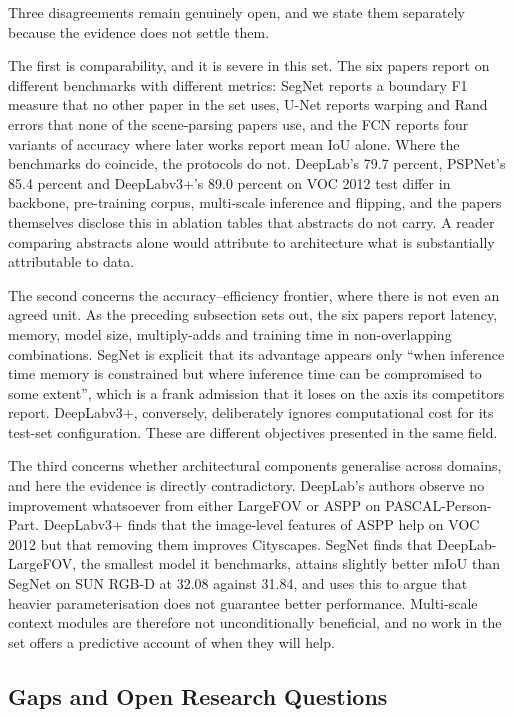 \documentclass[journal]{IEEEtran}
\begin{document}
Three disagreements remain genuinely open, and we state them separately because the
evidence does not settle them.

The first is comparability, and it is severe in this set. The six papers report on
different benchmarks with different metrics: SegNet reports a boundary F1 measure that
no other paper in the set uses, U-Net reports warping and Rand errors that none of the
scene-parsing papers use, and the FCN reports four variants of accuracy where later
works report mean IoU alone. Where the benchmarks do coincide, the protocols do not.
DeepLab's 79.7 percent, PSPNet's 85.4 percent and DeepLabv3+'s 89.0 percent on VOC
2012 test differ in backbone, pre-training corpus, multi-scale inference and
flipping, and the papers themselves disclose this in ablation tables that abstracts do
not carry. A reader comparing abstracts alone would attribute to architecture what is
substantially attributable to data.

The second concerns the accuracy--efficiency frontier, where there is not even an
agreed unit. As the preceding subsection sets out, the six papers report
latency, memory, model size, multiply-adds and training time in non-overlapping
combinations. SegNet is explicit that its advantage appears only ``when inference time
memory is constrained but where inference time can be compromised to some extent'',
which is a frank admission that it loses on the axis its competitors report.
DeepLabv3+, conversely, deliberately ignores computational cost for its test-set
configuration. These are different objectives presented in the same field.

The third concerns whether architectural components generalise across domains, and here
the evidence is directly contradictory. DeepLab's authors observe no improvement
whatsoever from either LargeFOV or ASPP on PASCAL-Person-Part. DeepLabv3+ finds that
the image-level features of ASPP help on VOC 2012 but that removing them improves
Cityscapes. SegNet finds that DeepLab-LargeFOV, the smallest model it benchmarks,
attains slightly better mIoU than SegNet on SUN RGB-D at 32.08 against 31.84, and uses
this to argue that heavier parameterisation does not guarantee better performance.
Multi-scale context modules are therefore not unconditionally beneficial, and no work
in the set offers a predictive account of when they will help.

\subsection{Gaps and Open Research Questions}
\end{document}
